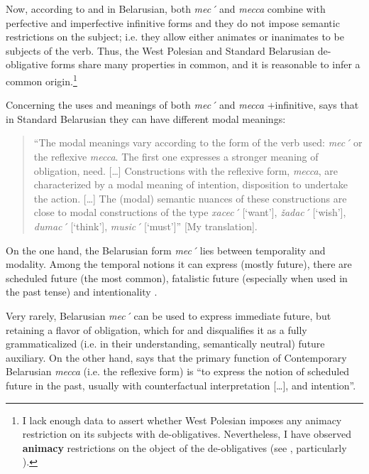 \documentclass[output=paper,colorlinks,citecolor=brown]{langscibook}
\begin{document}
Now, according to \citet[200]{Mackevic1959} and \citet[182]{Mazzitelli2011} in Belarusian, both \textit{mec´} and \textit{mecca} combine with perfective and imperfective infinitive forms and they do not impose semantic restrictions on the subject; i.e. they allow either animates or inanimates to be subjects of the verb. Thus, the West Polesian and Standard Belarusian de-obligative forms share many properties in common, and it is reasonable to infer a common origin.\footnote{I lack enough data to assert whether West Polesian imposes any animacy restriction on its subjects with de-obligatives. Nevertheless, I have observed \textbf{animacy} restrictions on the object of the de-obligatives (see , particularly ).}

Concerning the uses and meanings of both \textit{mec´} and \textit{mecca} +infinitive, \citet[200]{Mackevic1959} says that in Standard Belarusian they can have different modal meanings:

\begin{quote}
    “The modal meanings vary according to the form of the verb used: \textit{mec´} or the reflexive \textit{mecca}. The first one expresses a stronger meaning of obligation, need. […] Constructions with the reflexive form, \textit{mecca}, are characterized by a modal meaning of intention, disposition to undertake the action. […] The (modal) semantic nuances of these constructions are close to modal constructions of the type \textit{xacec´} [‘want’], \textit{žadac´} [‘wish’], \textit{dumac´} [‘think’], \textit{music´} [‘must’]” \citep[200]{Mackevic1959} [My translation].
\end{quote}

On the one hand, the Belarusian form \textit{mec´} lies between temporality and modality. Among the temporal notions it can express (mostly future), there are scheduled future (the most common), fatalistic future (especially when used in the past tense) and intentionality \citep[182, 190]{Mazzitelli2011}.

Very rarely, Belarusian \textit{mec´} can be used to express immediate future, but retaining a flavor of obligation, which for \citet[181]{Lomtev1956} and \citet[184]{Mazzitelli2011} disqualifies it as a fully grammaticalized (i.e. in their understanding, semantically neutral) future auxiliary. On the other hand, \citet[185]{Mazzitelli2011} says that the primary function of Contemporary Belarusian \textit{mecca} (i.e. the reflexive form) is “to express the notion of scheduled future in the past, usually with counterfactual interpretation […], and intention”.
\end{document}
